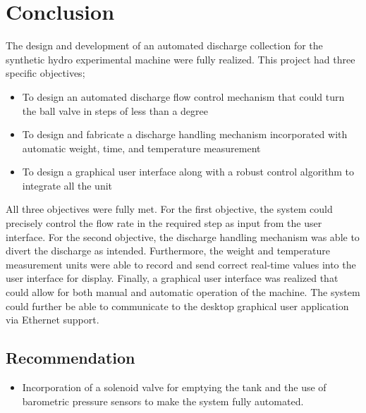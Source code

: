 \section{Conclusion}
\par
The design and development of an automated discharge collection for the synthetic hydro experimental machine were fully realized. This project had three specific objectives;
\begin{itemize}
    \item To design an automated discharge flow control mechanism that could turn the ball valve in steps of less than a degree
    \item To design and fabricate a discharge handling mechanism incorporated with automatic weight, time, and temperature measurement
    \item To design a graphical user interface along with a robust control algorithm to integrate all the unit
\end{itemize}
\par
All three objectives were fully met. For the first objective, the system could precisely control the flow rate in the required step as input from the user interface. For the second objective, the discharge handling mechanism was able to divert the discharge as intended. Furthermore, the weight and temperature measurement units were able to record and send correct real-time values into the user interface for display. Finally, a graphical user interface was realized that could allow for both manual and automatic operation of the machine. The system could further be able to communicate to the desktop graphical user application via Ethernet support.
\subsection{Recommendation}
\begin{itemize}
    \item Incorporation of a solenoid valve for emptying the tank and the use of barometric pressure sensors to make the system fully automated.
\end{itemize}

